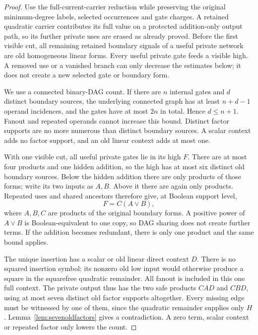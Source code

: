 \documentclass[11pt]{article}
\theoremstyle{definition}
\theoremstyle{remark}
\begin{document}
\begin{proof}
Use the full-current-carrier reduction while preserving the original
minimum-degree labels, selected occurrences and gate charges. A retained
quadratic carrier contributes its full value on a protected addition-only
output path, so its further private uses are erased as already proved.
Before the first visible cut, all remaining retained boundary signals of
a useful private network are old homogeneous linear forms.
Every useful private gate feeds a visible high. A removed use or a vanished
branch can only decrease the estimates below; it does not create a new
selected gate or boundary form.

We use a connected binary-DAG count. If there are $n$ internal gates and
$d$ distinct boundary sources, the underlying connected graph has at least
$n+d-1$ operand incidences, and the gates have at most $2n$ in total.
Hence $d\le n+1$. Fanout and repeated operands cannot increase this bound.
Distinct factor supports are no more numerous than distinct boundary
sources. A scalar context adds no factor support, and an old linear context
adds at most one.

With one visible cut, all useful private gates lie in its high $F$.
There are at most four products and one hidden addition, so the high has
at most six distinct old boundary sources. Below the hidden addition
there are only products of those forms; write its two inputs as $A,B$.
Above it there are again only products. Repeated uses and shared ancestors
therefore give, at Boolean support level,
\[
 F=C(A\vee B),
\]
where $A,B,C$ are products of the original boundary forms.
A positive power of $A\vee B$ is Boolean-equivalent to one copy, so DAG
sharing does not create further terms. If the addition becomes redundant,
there is only one product and the same bound applies.

The unique insertion has a scalar or old linear direct context $D$.
There is no squared insertion symbol: its nonzero old low input would
otherwise produce a square in the squarefree quadratic remainder.
All fanout is included in this one full context. The private output thus
has the two safe products $CAD$ and $CBD$, using at most seven distinct
old factor supports altogether. Every missing edge must be witnessed by
one of them, since the quadratic remainder supplies only $H$.
Lemma~\ref{lem:sevenoldfactors} gives a contradiction. A zero term,
scalar context or repeated factor only lowers the count.


\end{proof}
\end{document}
